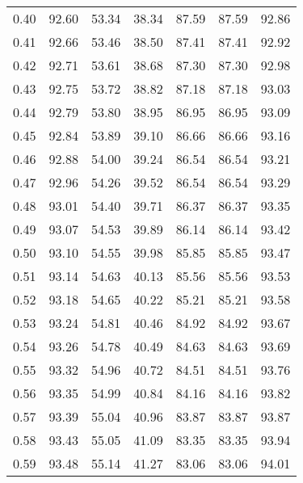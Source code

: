 \begin{tabular}{|c|c|c|c|c|c|c|}
      0.40 &     92.60 &     53.34 &      38.34 &   87.59 &      87.59 &         92.86 \\
      0.41 &     92.66 &     53.46 &      38.50 &   87.41 &      87.41 &         92.92 \\
      0.42 &     92.71 &     53.61 &      38.68 &   87.30 &      87.30 &         92.98 \\
      0.43 &     92.75 &     53.72 &      38.82 &   87.18 &      87.18 &         93.03 \\
      0.44 &     92.79 &     53.80 &      38.95 &   86.95 &      86.95 &         93.09 \\
      0.45 &     92.84 &     53.89 &      39.10 &   86.66 &      86.66 &         93.16 \\
      0.46 &     92.88 &     54.00 &      39.24 &   86.54 &      86.54 &         93.21 \\
      0.47 &     92.96 &     54.26 &      39.52 &   86.54 &      86.54 &         93.29 \\
      0.48 &     93.01 &     54.40 &      39.71 &   86.37 &      86.37 &         93.35 \\
      0.49 &     93.07 &     54.53 &      39.89 &   86.14 &      86.14 &         93.42 \\
      0.50 &     93.10 &     54.55 &      39.98 &   85.85 &      85.85 &         93.47 \\
      0.51 &     93.14 &     54.63 &      40.13 &   85.56 &      85.56 &         93.53 \\
      0.52 &     93.18 &     54.65 &      40.22 &   85.21 &      85.21 &         93.58 \\
      0.53 &     93.24 &     54.81 &      40.46 &   84.92 &      84.92 &         93.67 \\
      0.54 &     93.26 &     54.78 &      40.49 &   84.63 &      84.63 &         93.69 \\
      0.55 &     93.32 &     54.96 &      40.72 &   84.51 &      84.51 &         93.76 \\
      0.56 &     93.35 &     54.99 &      40.84 &   84.16 &      84.16 &         93.82 \\
      0.57 &     93.39 &     55.04 &      40.96 &   83.87 &      83.87 &         93.87 \\
      0.58 &     93.43 &     55.05 &      41.09 &   83.35 &      83.35 &         93.94 \\
      0.59 &     93.48 &     55.14 &      41.27 &   83.06 &      83.06 &         94.01 \\

\end{tabular}

